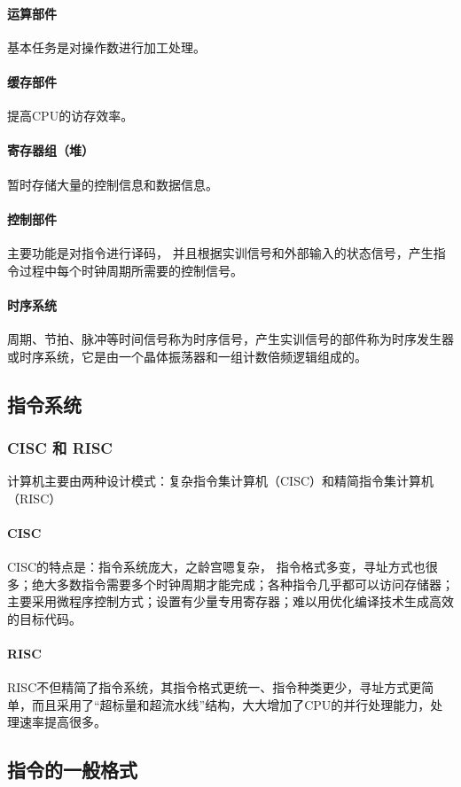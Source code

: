 \documentclass[a4paper, 12pt, oneside]{ctexart}
\begin{document}
	\paragraph{运算部件}
	基本任务是对操作数进行加工处理。
	\paragraph{缓存部件}
	提高CPU的访存效率。
	\paragraph{寄存器组（堆）}
	暂时存储大量的控制信息和数据信息。
	\paragraph{控制部件}
	主要功能是对指令进行译码， 并且根据实训信号和外部输入的状态信号，产生指令过程中每个时钟周期所需要的控制信号。
	\paragraph{时序系统}
	周期、节拍、脉冲等时间信号称为时序信号，产生实训信号的部件称为时序发生器或时序系统，它是由一个晶体振荡器和一组计数倍频逻辑组成的。
	\subsection{指令系统}
	\subsubsection{CISC 和 RISC}
	计算机主要由两种设计模式：复杂指令集计算机（CISC）和精简指令集计算机（RISC）
	\paragraph{CISC}
	CISC的特点是：指令系统庞大，之龄宫嗯复杂， 指令格式多变，寻址方式也很多；绝大多数指令需要多个时钟周期才能完成；各种指令几乎都可以访问存储器；主要采用微程序控制方式；设置有少量专用寄存器；难以用优化编译技术生成高效的目标代码。
	\paragraph{RISC}
	RISC不但精简了指令系统，其指令格式更统一、指令种类更少，寻址方式更简单，而且采用了“超标量和超流水线”结构，大大增加了CPU的并行处理能力，处理速率提高很多。
	\subsection{指令的一般格式}
\end{document}
